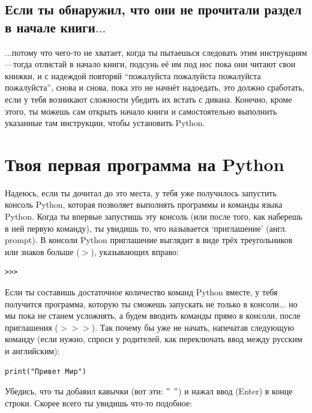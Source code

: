 \subsection*{\color{BrickRed}Если ты обнаружил, что они не прочитали раздел в начале книги$\ldots$}

$\ldots$потому что чего-то не хватает, когда ты пытаешься следовать этим инструкциям---тогда отлистай в начало книги, подсунь её им под нос пока они читают свои книжки, и с надеждой повторяй ``пожалуйста пожалуйста пожалуйста пожалуйста'', снова и снова, пока это не начнёт надоедать, это должно сработать, если у тебя возникают сложности убедить их встать с дивана.  Конечно, кроме этого, ты можешь сам открыть начало книги и самостоятельно выполнить указанные там инструкции, чтобы установить Python.

\section{Твоя первая программа на Python}

Надеюсь, если ты дочитал до это места, у тебя уже получилось запустить консоль Python, которая позволяет выполнять программы и команды языка Python. Когда ты впервые запустишь эту консоль (или после того, как наберешь в ней первую команду), ты увидишь то, что называется `приглашение' (англ. prompt).  В консоли Python  приглашение выглядит в виде трёх треугольников или знаков больше ($>$), указывающих вправо:

\begin{listing}
\begin{verbatim}
>>>
\end{verbatim}
\end{listing}
Если ты составишь достаточное количество команд Python вместе, у тебя получится программа, которую ты сможешь запускать не только в консоли$\ldots$ но мы пока не станем усложнять, а будем вводить команды прямо в консоли, после приглашения ($>>>$). Так почему бы уже не начать, напечатав следующую команду (если нужно, спроси у родителей, как переключать ввод между русским и английским):

\begin{listing}
\begin{verbatim}
print("Привет Мир")
\end{verbatim}
\end{listing}

Убедись, что ты добавил кавычки (вот эти: $"$ $"$) и нажал ввод (Enter) в конце строки. Скорее всего ты увидишь что-то подобное:

